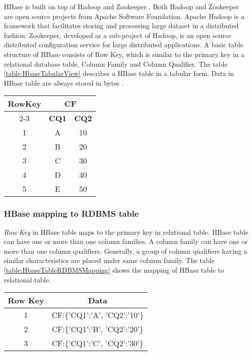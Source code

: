 \documentclass[11pt,a4paper,bibtotoc,idxtotoc,headsepline,footsepline,footexclude,BCOR12mm,DIV13]{scrbook}
\begin{document}
HBase is built on top of Hadoop and Zookeeper \cite{coprocessor:detail}. Both Hadoop and Zookeeper are open source projects from Apache Software Foundation. Apache Hadoop is a framework that facilitates storing and processing large dataset in a distributed fashion. Zookeeper, developed as a sub-project of Hadoop, is an open source distributed configuration service for large distributed applications. A basic table structure of HBase consists of Row Key, which is similar to the primary key in a relational database table, Column Family and Column Qualifier. The table \ref{table:HbaseTabularView} describes a HBase table in a tabular form. Data in HBase table are always stored in bytes \cite{hbase:site}.\newline  


\begin{table*}[htb!]
\centering
\begin{tabular}{|c|c|c|}
\hline
\multirow{2}{*}{\textbf{RowKey}} & \multicolumn{2}{c|}{\textbf{CF}}\\
\cline{2-3}
& \textbf{CQ1} & \textbf{CQ2}\\
\hline
1 & A & 10\\
2 & B & 20\\
3 & C & 30\\
4 & D & 40\\
5 & E & 50\\
\hline
\end{tabular}
\caption{HBase table in tabular view}
\label{table:HbaseTabularView}
\end{table*}
\subsubsection{HBase mapping to RDBMS table}
\emph{Row Key} in HBase table maps to the primary key in relational table. HBase table can have one or more than one column families. A column family can have one or more than one column qualifiers. Generally, a group of column qualifiers having a similar characteristics are placed under same column family. The table \ref{table:HbaseTableRDBMSMapping} shows the mapping of HBase table to relational table.

\begin{table*}[htb!]
\centering
\begin{tabular}{|c|c|}
\hline
\textbf{Row Key} & \textbf{Data}\\
\hline
1 & CF:\{'CQ1':'A', 'CQ2':'10'\}\\
2 & CF:\{'CQ1':'B', 'CQ2':'20'\}\\
3 & CF:\{'CQ1':'C', 'CQ2':'30'\}\\
\hline
\end{tabular}
\caption{HBase table mapping to RDBMS table}
\label{table:HbaseTableRDBMSMapping}
\end{table*}
\end{document}
